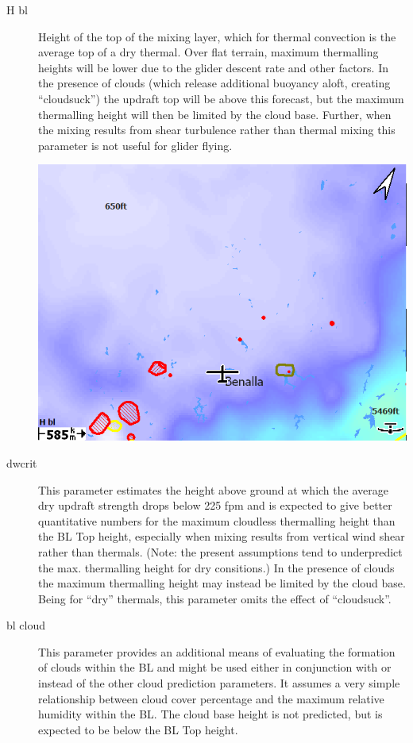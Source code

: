 \documentclass[a4paper,12pt]{refrep}
\begin{document}
\begin{description}
\item[H bl]  
Height of the top of the mixing layer, which for thermal convection is
the average top of a dry thermal.  Over flat terrain, maximum
thermalling heights will be lower due to the glider descent rate and
other factors.  In the presence of clouds (which release additional
buoyancy aloft, creating ``cloudsuck'') the updraft top will be above
this forecast, but the maximum thermalling height will then be limited
by the cloud base.  Further, when the mixing results from shear
turbulence rather than thermal mixing this parameter is not useful for
glider flying.

\begin{center}
\includegraphics[angle=0,width=0.8\linewidth,keepaspectratio='true']{figures/rasp-hbl.png}
\end{center}

\item[dwcrit]  
This parameter estimates the height above ground at which the average
dry updraft strength drops below 225 fpm and is expected to give
better quantitative numbers for the maximum cloudless thermalling
height than the BL Top height, especially when mixing results from
vertical wind shear rather than thermals.  (Note: the present
assumptions tend to underpredict the max. thermalling height for dry
consitions.) In the presence of clouds the maximum thermalling height
may instead be limited by the cloud base.  Being for ``dry'' thermals,
this parameter omits the effect of ``cloudsuck''.

\item[bl cloud]  
This parameter provides an additional means of evaluating the
formation of clouds within the BL and might be used either in
conjunction with or instead of the other cloud prediction parameters.
It assumes a very simple relationship between cloud cover percentage
and the maximum relative humidity within the BL.  The cloud base
height is not predicted, but is expected to be below the BL Top
height.


\end{description}
\end{document}
